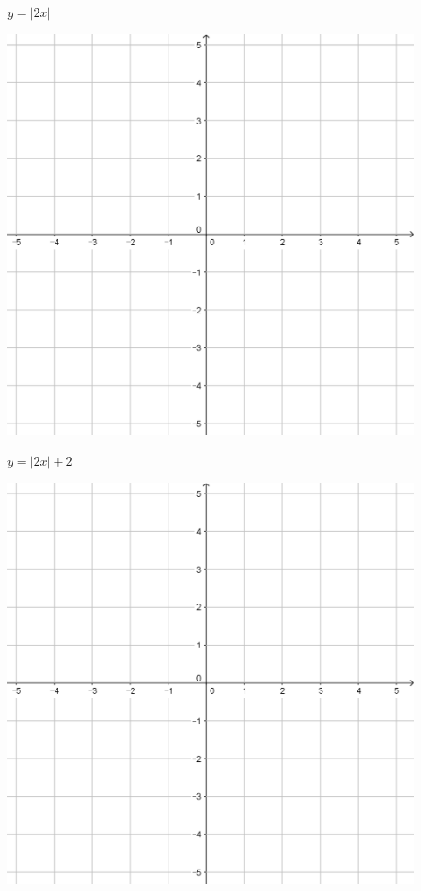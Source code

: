 \documentclass{oblivoir}
\begin{document}
\begin{minipage}{0.45\textwidth}\centering
\(y=|2x|\)
\par\bigskip\includegraphics[width=0.9\textwidth]{55}
\end{minipage}
\begin{minipage}{0.45\textwidth}\centering
\(y=|2x|+2\)
\par\bigskip\includegraphics[width=0.9\textwidth]{55}
\end{minipage}\bigskip\bigskip\par
\end{document}
